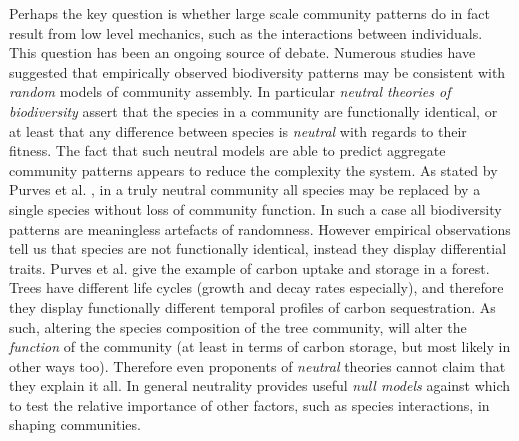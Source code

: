 Perhaps the key question is whether large scale community patterns do in fact result from low level mechanics, such as the interactions between individuals. This question has been an ongoing source of debate. Numerous studies have suggested that empirically observed biodiversity patterns may be consistent with \emph{random} models of community assembly. In particular \emph{neutral theories of biodiversity} \cite{hubbell2001unified,volkov2003neutral} assert that the species in a community are functionally identical, or at least that any difference between species is \emph{neutral} with regards to their fitness. The fact that such neutral models are able to predict aggregate community patterns appears to reduce the complexity the system. As stated by Purves et al. \cite{purves2005ecological}, in a truly neutral community all species may be replaced by a single species without loss of community function. In such a case all biodiversity patterns are meaningless artefacts of randomness. However empirical observations tell us that species are not functionally identical, instead they display differential traits. Purves et al. give the example of carbon uptake and storage in a forest. Trees have different life cycles (growth and decay rates especially), and therefore they display functionally different temporal profiles of carbon sequestration. As such, altering the species composition of the tree community, will alter the \emph{function} of the community (at least in terms of carbon storage, but most likely in other ways too). Therefore even proponents of \emph{neutral} theories cannot claim that they explain it all. In general neutrality provides useful \emph{null models} against which to test the relative importance of other factors, such as species interactions, in shaping communities.  



